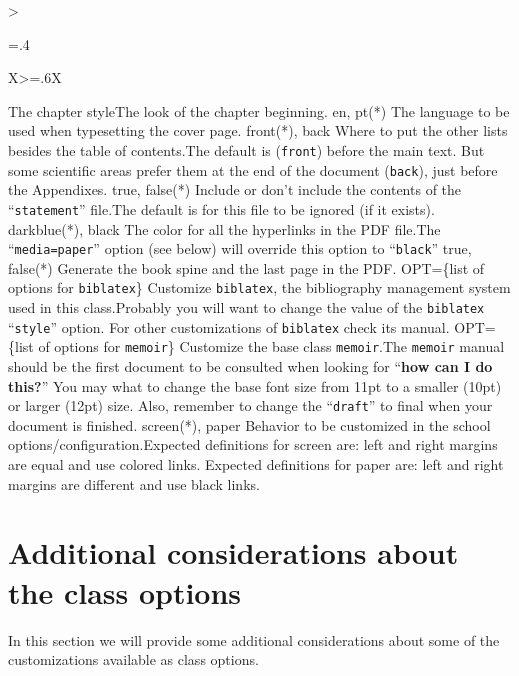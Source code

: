 \begin{xltabular}{\linewidth}{>{\hsize=.4\hsize\raggedright\arraybackslash}X>{\hsize=.6\hsize}X}
  {The chapter style}{The look of the chapter beginning.}
  \midrule
  {en, pt(*)}%
  {The language to be used when typesetting the cover page.}{}
  \midrule
  {front(*), back}%
  {Where to put the other lists besides the table of contents.}{The default is (\texttt{front}) before the main text.  But some scientific areas prefer them at the end of the document (\texttt{back}), just before the Appendixes.}
  \midrule
  {true, false(*)}%
  {Include or don't include the contents of the “\texttt{statement}” file.}{The default is for this file to be ignored (if it exists).}
  \midrule
  {darkblue(*), black}%
  {The color for all the hyperlinks in the PDF file.}{The “\texttt{media=paper}” option (see below) will override this option to “\texttt{black}”}
  \midrule
  {true, false(*)}%
  {Generate the book spine and the last page in the PDF.}{}
  \midrule
  {OPT=\{list of options for \texttt{biblatex}\}}%
  {Customize \texttt{biblatex}, the bibliography management system used in this class.}{Probably you will want to change the value of the \texttt{biblatex} “\texttt{style}” option. For other customizations of \texttt{biblatex} check its manual.}
  \midrule
  {OPT=\{list of options for \texttt{memoir}\}}%
  {Customize the base class \texttt{memoir}.}{The \texttt{memoir} manual should be the first document to be consulted when looking for “\textbf{how can I do this?}” You may what to change the base font size from 11pt to a smaller (10pt) or larger (12pt) size.  Also, remember to change the “\texttt{draft}” to final when your document is finished.}
  \midrule
  {screen(*), paper}%
  {Behavior to be customized in the school options/configuration.}{Expected definitions for screen are: left and right margins are equal and use colored links. Expected definitions for paper are: left and right margins are different and use black links.}
  \bottomrule
\end{xltabular}
\egroup

\section{Additional considerations about the class options}
\label{sec:additional_considerations}

In this section we will provide some additional considerations about some of the customizations available as class options.

